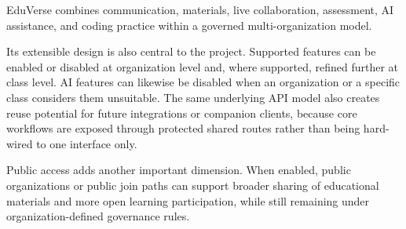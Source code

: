 EduVerse combines communication, materials, live collaboration, assessment, AI
assistance, and coding practice within a governed multi-organization model.

Its extensible design is also central to the project. Supported features can be
enabled or disabled at organization level and, where supported, refined further
at class level. AI features can likewise be disabled when an organization or a
specific class considers them unsuitable. The same underlying API model also
creates reuse potential for future integrations or companion clients, because
core workflows are exposed through protected shared routes rather than being
hard-wired to one interface only.

Public access adds another important dimension. When enabled, public
organizations or public join paths can support broader sharing of educational
materials and more open learning participation, while still remaining under
organization-defined governance rules.
